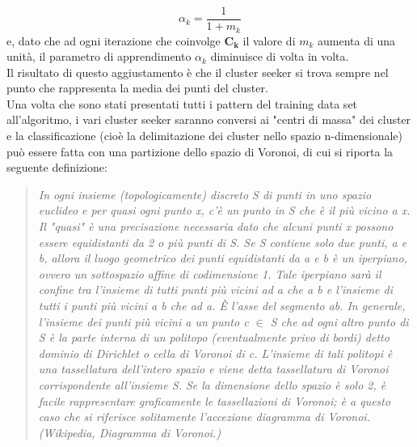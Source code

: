 \begin{equation}
	\alpha_k = \frac{1}{1 + m_k}
\end{equation} 
e, dato che ad ogni iterazione che coinvolge $\textbf{C}_\textbf{k}$ il valore di $m_k$ aumenta di una unità, il parametro di apprendimento $\alpha_k$ diminuisce di volta in volta. \\
Il risultato di questo aggiustamento è che il cluster seeker si trova sempre nel punto che rappresenta la media dei punti del cluster. \\
Una volta che sono stati presentati tutti i pattern del training data set all'algoritmo, i vari cluster seeker saranno conversi ai "centri di massa" dei cluster e la classificazione (cioè la delimitazione dei cluster nello spazio n-dimensionale) può essere fatta con una partizione dello spazio di Voronoi, di cui si riporta la seguente definizione:
\begin{quotation} \small
	\textit{In ogni insieme (topologicamente) discreto S di punti in uno spazio euclideo e per quasi ogni punto x, c'è un punto in S che è il più vicino a x. Il "quasi" è una precisazione necessaria dato che alcuni punti x possono essere equidistanti da 2 o più punti di S.
	Se S contiene solo due punti, a e b, allora il luogo geometrico dei punti equidistanti da a e b è un iperpiano, ovvero un sottospazio affine di codimensione 1. Tale iperpiano sarà il confine tra l'insieme di tutti punti più vicini ad a che a b e l'insieme di tutti i punti più vicini a b che ad a. È l'asse del segmento ab.
	In generale, l'insieme dei punti più vicini a un punto c $\in$ S che ad ogni altro punto di S è la parte interna di un politopo (eventualmente privo di bordi) detto dominio di Dirichlet o cella di Voronoi di c. L'insieme di tali politopi è una tassellatura dell'intero spazio e viene detta tassellatura di Voronoi corrispondente all'insieme S. Se la dimensione dello spazio è solo 2, è facile rappresentare graficamente le tassellazioni di Voronoi; è a questo caso che si riferisce solitamente l'accezione diagramma di Voronoi. \\
	(Wikipedia, Diagramma di Voronoi.)} 
\end{quotation}

